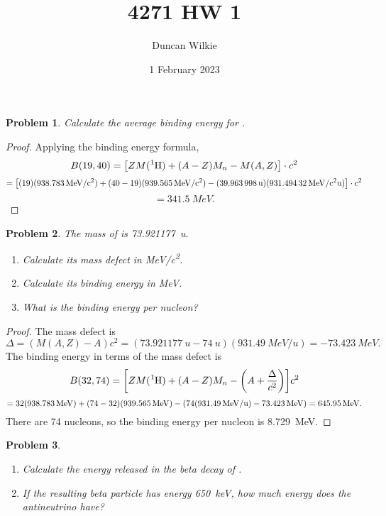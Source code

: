 \documentclass{article}
\title{4271 HW 1}
\author{Duncan Wilkie}
\date{1 February 2023}
\newtheorem{plm}{Problem}
\begin{document}
\maketitle

\begin{plm}
  Calculate the average binding energy for .
\end{plm}

\begin{proof}
  Applying the binding energy formula,
  \[
    B(19, 40) = \qty[ZM(\ce{^{1}H}) + (A - Z)M_{n} - M(A, Z)] \cdot c^{2}
  \]
  \[
    = \qty[(19)(\SI{938.783}{MeV/c^{2}}) + (40 - 19)(\SI{939.565}{MeV/c^{2}}) - (\SI{39.963998}{u})(\SI{931.49432}{MeV/c^{2}u})] \cdot c^{2}
  \]
  \[
    = \SI{341.5}{MeV}.
  \]
\end{proof}

\begin{plm}
  The mass of  is \SI{73.921177}{u}.
  \begin{enumerate}
  \item Calculate its mass defect in \si{MeV/c^2}.
  \item Calculate its binding energy in \si{MeV}.
  \item What is the binding energy per nucleon?
  \end{enumerate}
\end{plm}

\begin{proof}
  The mass defect is
  \[
    \Delta = (M(A, Z) - A)c^{2} = (\SI{73.921177}{u} - \SI{74}{u})(\SI{931.49}{MeV/u}) = \SI{-73.423}{MeV}.
  \]
  The binding energy in terms of the mass defect is
  \[
    B(32, 74) = \qty[ZM(\ce{^{1}H}) + (A - Z)M_{n} - \qty(A + \frac{\Delta}{c^{2}})]c^{2}
  \]
  \[
    = 32(\SI{938.783}{MeV}) + (74 - 32)(\SI{939.565}{MeV}) - \qty(74(\SI{931.49}{MeV/u}) - \SI{73.423}{MeV})
    = \SI{645.95}{MeV}.
  \]
  There are 74 nucleons, so the binding energy per nucleon is \SI{8.729}{MeV}.
\end{proof}

\begin{plm}
  \;
  \begin{enumerate}
  \item Calculate the energy released in the beta decay of .
  \item If the resulting beta particle has energy \SI{650}{keV}, how much energy does the antineutrino have?
  \end{enumerate}
\end{plm}
\end{document}
